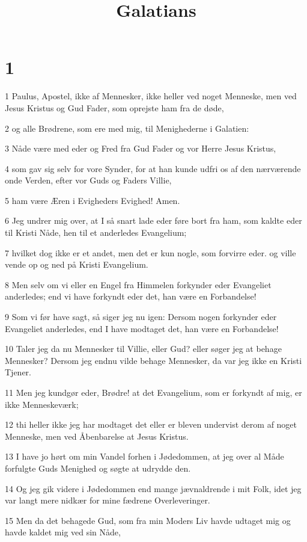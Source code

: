 

\title{Galatians}


\chapter{1}

\par 1 Paulus, Apostel, ikke af Mennesker, ikke heller ved noget Menneske, men ved Jesus Kristus og Gud Fader, som oprejste ham fra de døde,
\par 2 og alle Brødrene, som ere med mig, til Menighederne i Galatien:
\par 3 Nåde være med eder og Fred fra Gud Fader og vor Herre Jesus Kristus,
\par 4 som gav sig selv for vore Synder, for at han kunde udfri os af den nærværende onde Verden, efter vor Guds og Faders Villie,
\par 5 ham være Æren i Evigheders Evighed! Amen.
\par 6 Jeg undrer mig over, at I så snart lade eder føre bort fra ham, som kaldte eder til Kristi Nåde, hen til et anderledes Evangelium;
\par 7 hvilket dog ikke er et andet, men det er kun nogle, som forvirre eder. og ville vende op og ned på Kristi Evangelium.
\par 8 Men selv om vi eller en Engel fra Himmelen forkynder eder Evangeliet anderledes; end vi have forkyndt eder det, han være en Forbandelse!
\par 9 Som vi før have sagt, så siger jeg nu igen: Dersom nogen forkynder eder Evangeliet anderledes, end I have modtaget det, han være en Forbandelse!
\par 10 Taler jeg da nu Mennesker til Villie, eller Gud? eller søger jeg at behage Mennesker? Dersom jeg endnu vilde behage Mennesker, da var jeg ikke en Kristi Tjener.
\par 11 Men jeg kundgør eder, Brødre! at det Evangelium, som er forkyndt af mig, er ikke Menneskeværk;
\par 12 thi heller ikke jeg har modtaget det eller er bleven undervist derom af noget Menneske, men ved Åbenbarelse at Jesus Kristus.
\par 13 I have jo hørt om min Vandel forhen i Jødedommen, at jeg over al Måde forfulgte Guds Menighed og søgte at udrydde den.
\par 14 Og jeg gik videre i Jødedommen end mange jævnaldrende i mit Folk, idet jeg var langt mere nidkær for mine fædrene Overleveringer.
\par 15 Men da det behagede Gud, som fra min Moders Liv havde udtaget mig og havde kaldet mig ved sin Nåde,
